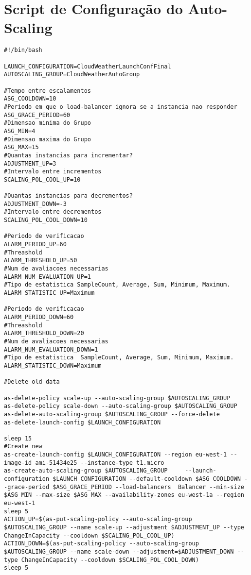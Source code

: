 
\chapter{Script de Configuração do Auto-Scaling} 

\label{anexoA} 


\lstset{language=bash,breaklines=true} 
\begin{lstlisting}
#!/bin/bash

LAUNCH_CONFIGURATION=CloudWeatherLaunchConfFinal
AUTOSCALING_GROUP=CloudWeatherAutoGroup

#Tempo entre escalamentos
ASG_COOLDOWN=10
#Periodo em que o load-balancer ignora se a instancia nao responder
ASG_GRACE_PERIOD=60
#Dimensao minima do Grupo
ASG_MIN=4
#Dimensao maxima do Grupo
ASG_MAX=15
#Quantas instancias para incrementar?
ADJUSTMENT_UP=3
#Intervalo entre incrementos
SCALING_POL_COOL_UP=10

#Quantas instancias para decrementos?
ADJUSTMENT_DOWN=-3
#Intervalo entre decrementos
SCALING_POL_COOL_DOWN=10

#Periodo de verificacao
ALARM_PERIOD_UP=60
#Threashold
ALARM_THRESHOLD_UP=50
#Num de avaliacoes necessarias
ALARM_NUM_EVALUATION_UP=1
#Tipo de estatistica SampleCount, Average, Sum, Minimum, Maximum.
ALARM_STATISTIC_UP=Maximum

#Periodo de verificacao
ALARM_PERIOD_DOWN=60
#Threashold
ALARM_THRESHOLD_DOWN=20
#Num de avaliacoes necessarias
ALARM_NUM_EVALUATION_DOWN=1
#Tipo de estatistica  SampleCount, Average, Sum, Minimum, Maximum.
ALARM_STATISTIC_DOWN=Maximum

#Delete old data

as-delete-policy scale-up --auto-scaling-group $AUTOSCALING_GROUP
as-delete-policy scale-down --auto-scaling-group $AUTOSCALING_GROUP
as-delete-auto-scaling-group $AUTOSCALING_GROUP --force-delete
as-delete-launch-config $LAUNCH_CONFIGURATION

sleep 15
#Create new
as-create-launch-config $LAUNCH_CONFIGURATION --region eu-west-1 --image-id ami-51434e25 --instance-type t1.micro
as-create-auto-scaling-group $AUTOSCALING_GROUP 	--launch-configuration $LAUNCH_CONFIGURATION --default-cooldown $ASG_COOLDOWN --grace-period $ASG_GRACE_PERIOD --load-balancers  Balancer --min-size $ASG_MIN --max-size $ASG_MAX --availability-zones eu-west-1a --region eu-west-1
sleep 5 
ACTION_UP=$(as-put-scaling-policy --auto-scaling-group $AUTOSCALING_GROUP --name scale-up --adjustment $ADJUSTMENT_UP --type ChangeInCapacity --cooldown $SCALING_POL_COOL_UP)
ACTION_DOWN=$(as-put-scaling-policy --auto-scaling-group $AUTOSCALING_GROUP --name scale-down --adjustment=$ADJUSTMENT_DOWN --type ChangeInCapacity --cooldown $SCALING_POL_COOL_DOWN)
sleep 5



\end{lstlisting}
